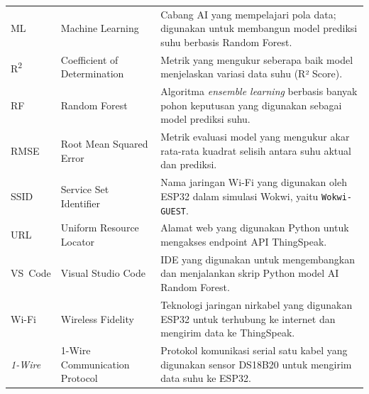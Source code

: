 \begin{longtable}{L{2.2cm} L{4.5cm} L{6.0cm}}
ML      & Machine Learning & Cabang AI yang mempelajari pola data; digunakan untuk membangun model prediksi suhu berbasis Random Forest.\\
R\textsuperscript{2} & Coefficient of Determination & Metrik yang mengukur seberapa baik model menjelaskan variasi data suhu (R² Score).\\
RF      & Random Forest & Algoritma \textit{ensemble learning} berbasis banyak pohon keputusan yang digunakan sebagai model prediksi suhu.\\
RMSE    & Root Mean Squared Error & Metrik evaluasi model yang mengukur akar rata-rata kuadrat selisih antara suhu aktual dan prediksi.\\
SSID    & Service Set Identifier & Nama jaringan Wi-Fi yang digunakan oleh ESP32 dalam simulasi Wokwi, yaitu \texttt{Wokwi-GUEST}.\\
URL     & Uniform Resource Locator & Alamat web yang digunakan Python untuk mengakses endpoint API ThingSpeak.\\
VS~Code & Visual Studio Code & IDE yang digunakan untuk mengembangkan dan menjalankan skrip Python model AI Random Forest.\\
Wi-Fi   & Wireless Fidelity & Teknologi jaringan nirkabel yang digunakan ESP32 untuk terhubung ke internet dan mengirim data ke ThingSpeak.\\
\textit{1-Wire} & 1-Wire Communication Protocol & Protokol komunikasi serial satu kabel yang digunakan sensor DS18B20 untuk mengirim data suhu ke ESP32.\\
\bottomrule
\end{longtable}
\endgroup
